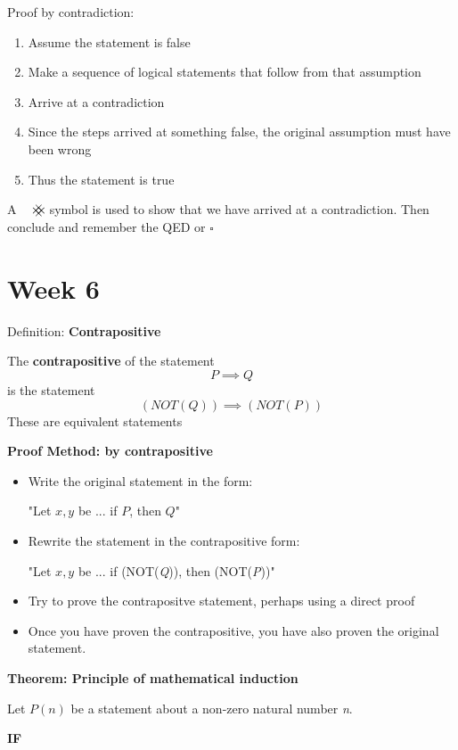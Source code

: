 \documentclass{article}
\newcommand{\contradiction}{
    {\hbox{
        \setbox0=\hbox{$\mkern-3mu{\times}\mkern-3mu$}
        \setbox1=\hbox to0pt{\hss\copy0\hss}
        \copy0\raisebox{0.5\wd0}{\copy1}\raisebox{-0.5\wd0}{\box1}\box0}}
}
\begin{document}
Proof by contradiction:
\begin{enumerate}
    \item Assume the statement is false
    \item Make a sequence of logical statements that follow from that assumption
    \item Arrive at a contradiction
    \item Since the steps arrived at something false, the original assumption must have been wrong
    \item Thus the statement is true
\end{enumerate}
A \(\contradiction\) symbol is used to show that we have arrived at a contradiction. Then conclude and remember the QED or \(\square\)

\section{Week 6}
Definition: \textbf{Contrapositive}

The \textbf{contrapositive} of the statement 
\begin{equation}
    P \implies Q
\end{equation}
is the statement
\begin{equation}
    (NOT(Q)) \implies (NOT(P))
\end{equation}
These are equivalent statements

\newpage
\textbf{Proof Method: by contrapositive}
\begin{itemize}
    \item Write the original statement in the form:
    
    "Let \(x,y\) be ... if \(P\), then \(Q\)"
    \item Rewrite the statement in the contrapositive form:
    
    "Let \(x,y\) be ... if (NOT(\textit{Q})), then (NOT(\textit{P}))"
    \item Try to prove the contrapositve statement, perhaps using a direct proof
    \item Once you have proven the contrapositive, you have also proven the original statement.
\end{itemize}

\vspace{\baselineskip}
\textbf{Theorem: Principle of mathematical induction}

Let \(P(n)\) be a statement about a non-zero natural number \textit{n}.

\hspace{\parindent}\textbf{IF}
\end{document}
